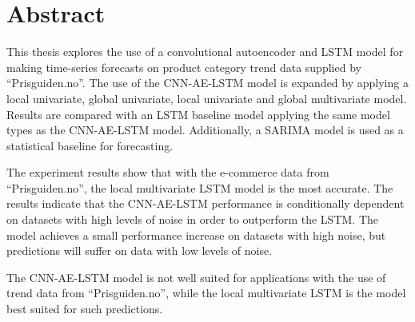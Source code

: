 \section*{Abstract}
\label{section:Abstract}





This thesis explores the use of a convolutional autoencoder and LSTM model for making time-series
forecasts on product category trend data supplied by ``Prisguiden.no''.
The use of the CNN-AE-LSTM model is expanded by applying a local univariate, global univariate, local univariate and global multivariate model.
Results are compared with an LSTM baseline model applying the same model types as the CNN-AE-LSTM model.
Additionally, a SARIMA model is used as a statistical baseline for forecasting.


The experiment results show that with the e-commerce data from ``Prisguiden.no'',
the local multivariate LSTM model is the most accurate.
The results indicate that the CNN-AE-LSTM performance is conditionally dependent on datasets with high levels of noise in order to outperform the LSTM.
The model achieves a small performance increase on datasets with high noise, but predictions will suffer
on data with low levels of noise.

The CNN-AE-LSTM model is not well suited for applications with the use of trend data from ``Prisguiden.no'',
while the local multivariate LSTM is the model best suited for such predictions.







